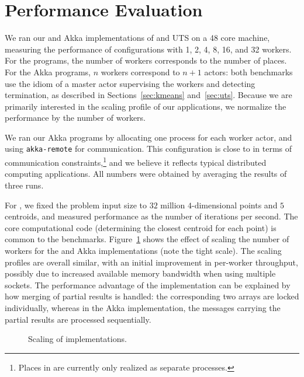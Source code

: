 \section{Performance Evaluation}
\label{sec:perf}
We ran our \apgas and Akka implementations of \kmeans and UTS on a 48 core
machine, measuring the performance of configurations with 1, 2, 4, 8, 16, and
32 workers. For the \apgas programs, the number of workers corresponds to the
number of places. For the Akka programs, $n$ workers correspond to $n+1$
actors: both benchmarks use the idiom of a master actor supervising the
workers and detecting termination, as described in Sections~\ref{sec:kmeans}
and~\ref{sec:uts}. Because we are primarily interested in the scaling profile of
our applications, we normalize the performance by the number of workers.

We ran our Akka programs by allocating one process for each worker actor, and
using \lstinline{akka-remote} for communication. This configuration is close to
\apgas in terms of communication constraints,\footnote{Places in \apgas are
currently only realized as separate processes.} and we believe it reflects
typical distributed computing applications. All numbers were obtained by
averaging the results of three runs.

For \kmeans, we fixed the problem input size to $32$ million $4$-dimensional
points and $5$ centroids, and measured performance as the number of iterations
per second. The core computational code (determining the closest centroid for
each point) is common to the benchmarks. Figure~\ref{fig:kmeans-scaling} shows
the effect of scaling the number of workers for the \apgas and Akka
implementations (note the tight scale). The scaling profiles are overall
similar, with an initial improvement in per-worker throughput, possibly due to
increased available memory bandwidth when using multiple sockets.
The performance advantage of the \apgas implementation can be explained by how merging of partial results is handled:
the corresponding two arrays are locked individually, whereas in the Akka
implementation, the messages carrying the partial results are processed
sequentially.

\begin{figure}
\vspace{-0.3cm}
\hspace{-0.2cm}
\begingroup\graphicspath{{figures/}}\endgroup
\vspace{-0.2cm}
\caption{Scaling of \kmeans implementations.}
\label{fig:kmeans-scaling}
\end{figure}

